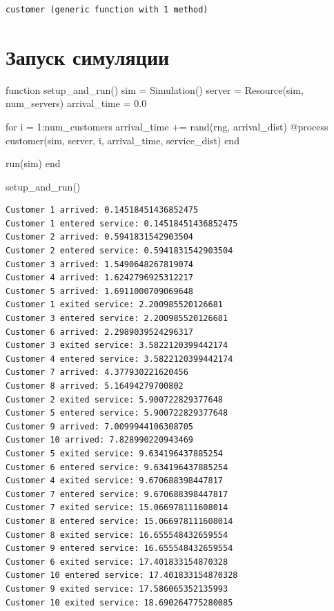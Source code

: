 \documentclass[
  12pt,
  a4paper,
  DIV=11,
  numbers=noendperiod]{scrreprt}
\newenvironment{Shaded}{\begin{snugshade}}{\end{snugshade}}
\newcommand{\ControlFlowTok}[1]{\textcolor[rgb]{0.00,0.23,0.31}{#1}}
\newcommand{\FloatTok}[1]{\textcolor[rgb]{0.68,0.00,0.00}{#1}}
\newcommand{\FunctionTok}[1]{\textcolor[rgb]{0.28,0.35,0.67}{#1}}
\newcommand{\KeywordTok}[1]{\textcolor[rgb]{0.00,0.23,0.31}{#1}}
\newcommand{\NormalTok}[1]{\textcolor[rgb]{0.00,0.23,0.31}{#1}}
\newcommand{\OperatorTok}[1]{\textcolor[rgb]{0.37,0.37,0.37}{#1}}
\newcommand{\PreprocessorTok}[1]{\textcolor[rgb]{0.68,0.00,0.00}{#1}}
\begin{document}
\begin{verbatim}
customer (generic function with 1 method)
\end{verbatim}

\section{Запуск
симуляции}\label{ux437ux430ux43fux443ux441ux43a-ux441ux438ux43cux443ux43bux44fux446ux438ux438}

\begin{Shaded}
\begin{Highlighting}[]
\KeywordTok{function} \FunctionTok{setup\_and\_run}\NormalTok{()}
\NormalTok{    sim }\OperatorTok{=} \FunctionTok{Simulation}\NormalTok{()}
\NormalTok{    server }\OperatorTok{=} \FunctionTok{Resource}\NormalTok{(sim, num\_servers)}
\NormalTok{    arrival\_time }\OperatorTok{=} \FloatTok{0.0}

    \ControlFlowTok{for}\NormalTok{ i }\OperatorTok{=} \FloatTok{1}\OperatorTok{:}\NormalTok{num\_customers}
\NormalTok{        arrival\_time }\OperatorTok{+=} \FunctionTok{rand}\NormalTok{(rng, arrival\_dist)}
        \PreprocessorTok{@process} \FunctionTok{customer}\NormalTok{(sim, server, i, arrival\_time, service\_dist)}
    \ControlFlowTok{end}

    \FunctionTok{run}\NormalTok{(sim)}
\KeywordTok{end}

\FunctionTok{setup\_and\_run}\NormalTok{()}
\end{Highlighting}
\end{Shaded}

\begin{verbatim}
Customer 1 arrived: 0.14518451436852475
Customer 1 entered service: 0.14518451436852475
Customer 2 arrived: 0.5941831542903504
Customer 2 entered service: 0.5941831542903504
Customer 3 arrived: 1.5490648267819074
Customer 4 arrived: 1.6242796925312217
Customer 5 arrived: 1.6911000709069648
Customer 1 exited service: 2.200985520126681
Customer 3 entered service: 2.200985520126681
Customer 6 arrived: 2.2989039524296317
Customer 3 exited service: 3.5822120399442174
Customer 4 entered service: 3.5822120399442174
Customer 7 arrived: 4.377930221620456
Customer 8 arrived: 5.16494279700802
Customer 2 exited service: 5.900722829377648
Customer 5 entered service: 5.900722829377648
Customer 9 arrived: 7.0099944106308705
Customer 10 arrived: 7.828990220943469
Customer 5 exited service: 9.634196437885254
Customer 6 entered service: 9.634196437885254
Customer 4 exited service: 9.670688398447817
Customer 7 entered service: 9.670688398447817
Customer 7 exited service: 15.066978111608014
Customer 8 entered service: 15.066978111608014
Customer 8 exited service: 16.655548432659554
Customer 9 entered service: 16.655548432659554
Customer 6 exited service: 17.401833154870328
Customer 10 entered service: 17.401833154870328
Customer 9 exited service: 17.586065352135993
Customer 10 exited service: 18.690264775280085
\end{verbatim}
\end{document}
